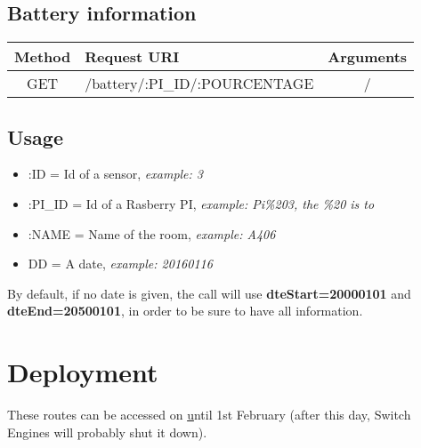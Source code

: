 \documentclass[a4paper]{article}
\begin{document}
\subsection{Battery information}
\begin{center}
\begin{tabular}{| c | l | c |}
\hline
\textbf{Method} & \textbf{Request URI} & \textbf{Arguments} \\ \hline
GET & /battery/:PI\_ID/:POURCENTAGE & / \\ \hline
\end{tabular}
\end{center}

\subsection{Usage}
\begin{itemize}
\item :ID = Id of a sensor, \textit{example: 3}
\item :PI\_ID = Id of a Rasberry PI, \textit{example: Pi\%203, the \%20 is to }
\item :NAME = Name of the room, \textit{example: A406}
\item DD = A date, \textit{example: 20160116}
\end{itemize}
By default, if no date is given, the call will use \textbf{dteStart=20000101} and \textbf{dteEnd=20500101}, in order to be sure to have all information.

\section{Deployment}
These routes can be accessed on \href{http://86.119.33.122:9000} until 1st February (after this day, Switch Engines will probably shut it down).
\end{document}
